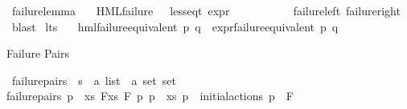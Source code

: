 \begin{isabellebody}
\endisatagproof
{\isafoldproof}%
%
\isadelimproof
\isanewline
%
\endisadelimproof
\isanewline
{}\isamarkupfalse%
\ failure{\isacharunderscore}{\kern0pt}lemma{\isacharcolon}{\kern0pt}\isanewline
\ \ \ {\isachardoublequoteopen}{\isacharparenleft}{\kern0pt}HML{\isacharunderscore}{\kern0pt}failure\ {\isasymphi}{\isacharparenright}{\kern0pt}\ {\isacharequal}{\kern0pt}\ {\isacharparenleft}{\kern0pt}less{\isacharunderscore}{\kern0pt}eq{\isacharunderscore}{\kern0pt}t\ {\isacharparenleft}{\kern0pt}expr\ {\isasymphi}{\isacharparenright}{\kern0pt}\ {\isacharparenleft}{\kern0pt}{\isasyminfinity}{\isacharcomma}{\kern0pt}\ {}{\isacharcomma}{\kern0pt}\ {}{\isacharcomma}{\kern0pt}\ {}{\isacharcomma}{\kern0pt}\ {}{\isacharcomma}{\kern0pt}\ {}{\isacharparenright}{\kern0pt}{\isacharparenright}{\kern0pt}{\isachardoublequoteclose}\isanewline
%
\isadelimproof
\ \ %
\endisadelimproof
%
\isatagproof
{}\isamarkupfalse%
\ failure{\isacharunderscore}{\kern0pt}left\ failure{\isacharunderscore}{\kern0pt}right\ \isamarkupfalse%
\ blast%
\endisatagproof
{\isafoldproof}%
%
\isadelimproof
\isanewline
%
\endisadelimproof
\isanewline
{}\isamarkupfalse%
\ lts\ \ \isanewline
{}\isamarkupfalse%
\ {\isachardoublequoteopen}hml{\isacharunderscore}{\kern0pt}failure{\isacharunderscore}{\kern0pt}equivalent\ p\ q\ {\isasymlongleftrightarrow}\ expr{\isacharunderscore}{\kern0pt}failure{\isacharunderscore}{\kern0pt}equivalent\ p\ q{\isachardoublequoteclose}%
\isadelimproof
\ \ %
\endisadelimproof
%
\isatagproof
{}\isamarkupfalse%
%
\endisatagproof
{\isafoldproof}%
%
\isadelimproof
%
\endisadelimproof
%
\begin{isamarkuptext}%
Failure Pairs%
\end{isamarkuptext}\isamarkuptrue%
\isamarkupfalse%
\ failure{\isacharunderscore}{\kern0pt}pairs\ {\isacharcolon}{\kern0pt}{\isacharcolon}{\kern0pt}\ {\isacartoucheopen}{\isacharprime}{\kern0pt}s\ {\isasymRightarrow}\ {\isacharparenleft}{\kern0pt}{\isacharprime}{\kern0pt}a\ list\ {\isasymtimes}\ {\isacharprime}{\kern0pt}a\ set{\isacharparenright}{\kern0pt}\ set{\isacartoucheclose}\isanewline
\ \ \isanewline
{\isacartoucheopen}failure{\isacharunderscore}{\kern0pt}pairs\ p\ {\isasymequiv}\ {\isacharbraceleft}{\kern0pt}{\isacharparenleft}{\kern0pt}xs{\isacharcomma}{\kern0pt}\ F{\isacharparenright}{\kern0pt}{\isacharbar}{\kern0pt}xs\ F{\isachardot}{\kern0pt}\ {\isasymexists}p{\isacharprime}{\kern0pt}{\isachardot}{\kern0pt}\ p\ {\isasymmapsto}{\isachardollar}{\kern0pt}\ xs\ p{\isacharprime}{\kern0pt}\ {\isasymand}\ {\isacharparenleft}{\kern0pt}initial{\isacharunderscore}{\kern0pt}actions\ p{\isacharprime}{\kern0pt}\ {\isasyminter}\ F\ {\isacharequal}{\kern0pt}\ {\isacharbraceleft}{\kern0pt}{\isacharbraceright}{\kern0pt}{\isacharparenright}{\kern0pt}{\isacharbraceright}{\kern0pt}{\isacartoucheclose}%

\end{isabellebody}
